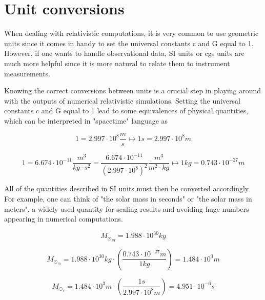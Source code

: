 \appendix
{}
\chapter{Unit conversions}\label{unit conv}

When dealing with relativistic computations, it is very common to use geometric units since it comes in handy to set the universal constants c and G equal to 1. However, if one wants to handle observational data, SI units or cgs units are much more helpful since it is more natural to relate them to instrument measurements.

Knowing the correct conversions between units is a crucial step in playing around with the outputs of numerical relativistic simulations. Setting  the universal constants c and G equal to 1 lead to some equivalences of physical quantities, which can be interpreted in "spacetime" language as
  
$$
1 = 2.997\cdot10^8 \frac{m}{s} \longmapsto 1s = 2.997\cdot10^8 m
$$

$$ 
1 = 6.674\cdot10^{-11} \frac{m^3}{kg \cdot s^2} = \frac{6.674\cdot10^{-11}}{\left( 2.997\cdot 10^8 \right)^2} \frac{m^3}{m^2 \cdot kg} \longmapsto 1kg = 0.743 \cdot 10^{-27}m
$$

All of the quantities described in SI units must then be converted accordingly. For example, one can think of "the solar mass in seconds" or "the solar mass in meters", a widely used quantity for scaling results and avoiding huge numbers appearing in numerical computations.

$$
M_{\odot_{SI}} = 1.988\cdot10^{30} kg
$$

$$
M_{\odot_{m}} = 1.988\cdot10^{30} kg \cdot \left( \frac{0.743\cdot 10^{-27}m}{1kg} \right) = 1.484 \cdot 10^{3} m
$$

$$
M_{\odot_{s}} = 1.484 \cdot 10^{3} m \cdot \left( \frac{1s}{2.997\cdot10^8 m} \right) = 4.951 \cdot 10^{-6} s
$$

